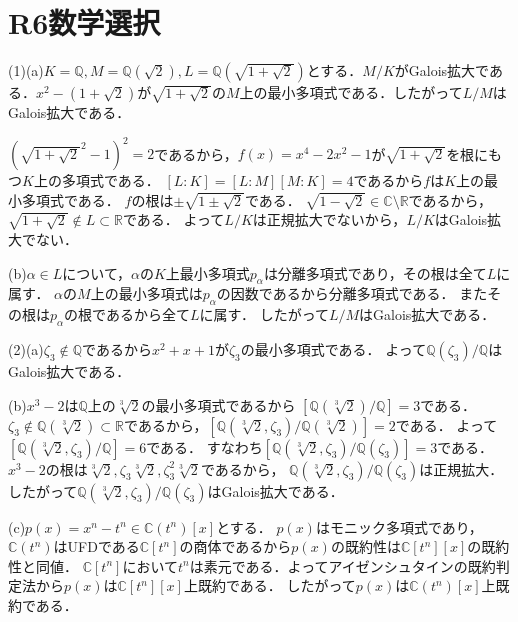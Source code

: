 \documentclass[
		book,
		head_space=20mm,
		foot_space=20mm,
		gutter=10mm,
		line_length=190mm
]{jlreq}
\begin{document}
\section{R6数学選択}
(1)(a)$K=\mathbb{Q},M=\mathbb{Q}(\sqrt{2}),L=\mathbb{Q}(\sqrt{1+\sqrt{2}})$とする．$M/K$がGalois拡大である．$x^2-(1+\sqrt{2})$が$\sqrt{1+\sqrt{2}}$の$M$上の最小多項式である．したがって$L/M$はGalois拡大である．

$(\sqrt{1+\sqrt{2}}^2-1)^2=2$であるから，$f(x)=x^4-2x^2-1$が$\sqrt{1+\sqrt{2}}$を根にもつ$K$上の多項式である．
$[L:K]=[L:M][M:K]=4$であるから$f$は$K$上の最小多項式である．
$f$の根は$\pm\sqrt{1\pm\sqrt{2}}$である．
$\sqrt{1-\sqrt{2}}\in \mathbb{C}\setminus \mathbb{R}$であるから，
$\sqrt{1+\sqrt{2}}\notin L\subset \mathbb{R}$である．
よって$L/K$は正規拡大でないから，$L/K$はGalois拡大でない．

(b)$\alpha\in L$について，$\alpha$の$K$上最小多項式$p_{\alpha}$は分離多項式であり，その根は全て$L$に属す．
$\alpha$の$M$上の最小多項式は$p_{\alpha}$の因数であるから分離多項式である．
またその根は$p_{\alpha}$の根であるから全て$L$に属す．
したがって$L/M$はGalois拡大である．

(2)(a)$\zeta_3\notin \mathbb{Q}$であるから$x^2+x+1$が$\zeta_3$の最小多項式である．
よって$\mathbb{Q}(\zeta_3)/\mathbb{Q}$はGalois拡大である．

(b)$x^3-2$は$\mathbb{Q}$上の$\sqrt[3]{2}$の最小多項式であるから
$[\mathbb{Q}(\sqrt[3]{2})/\mathbb{Q}]=3$である．$\zeta_3\notin \mathbb{Q}(\sqrt[3]{2})\subset \mathbb{R}$であるから，$[\mathbb{Q}(\sqrt[3]{2},\zeta_3)/\mathbb{Q}(\sqrt[3]{2})]=2$である．
よって$[\mathbb{Q}(\sqrt[3]{2},\zeta_3)/\mathbb{Q}]=6$である．
すなわち$[\mathbb{Q}(\sqrt[3]{2},\zeta_3)/\mathbb{Q}(\zeta_3)]=3$である．
$x^3-2$の根は$\sqrt[3]{2},\zeta_3\sqrt[3]{2},\zeta_3^2\sqrt[3]{2}$であるから，
$\mathbb{Q}(\sqrt[3]{2},\zeta_3)/\mathbb{Q}(\zeta_3)$は正規拡大．
したがって$\mathbb{Q}(\sqrt[3]{2},\zeta_3)/\mathbb{Q}(\zeta_3)$はGalois拡大である．

(c)$p(x)=x^n-t^n\in \mathbb{C}(t^n)[x]$とする．
$p(x)$はモニック多項式であり，$\mathbb{C}(t^n)$はUFDである$\mathbb{C}[t^n]$の商体であるから$p(x)$の既約性は$\mathbb{C}[t^n][x]$の既約性と同値．
$\mathbb{C}[t^n]$において$t^n$は素元である．よってアイゼンシュタインの既約判定法から$p(x)$は$\mathbb{C}[t^n][x]$上既約である．
したがって$p(x)$は$\mathbb{C}(t^n)[x]$上既約である．
\end{document}
